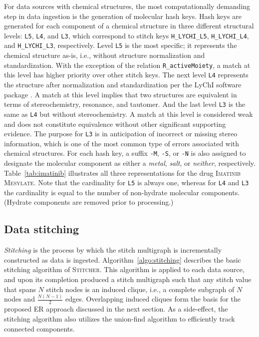 \documentclass{bmcart}
\newcommand\st{\textsc{Stitcher}}
\begin{document}
For data sources with chemical structures, the most computationally
demanding step in data ingestion is the generation of molecular hash
keys. Hash keys are generated for each component of a chemical
structure in three different structural
levels: \texttt{L5}, \texttt{L4}, and \texttt{L3}, which correspond to
stitch keys \texttt{H\_LYCHI\_L5}, \texttt{H\_LYCHI\_L4},
and \texttt{H\_LYCHI\_L3}, respectively. Level \texttt{L5} is the most
specific; it represents the chemical structure as-is, i.e., without
structure normalization and standardization. With the exception of the
relation \texttt{R\_activeMoiety}, a match at this level has higher
priority over other stitch keys. The next level \texttt{L4} represents
the structure after normalization and standardization per the LyChI
software package \cite{lychi}. A match at this level implies that two
structures are equivalent 
in terms of stereochemistry, resonance, and tautomer. And the last
level \texttt{L3} is the same as \texttt{L4} but without
stereochemistry. A match at this level is considered weak and does not
constitute equivalence without other significant supporting evidence.
The purpose for \texttt{L3} is in anticipation of incorrect or missing
stereo information, which is one of the most common type of errors
associated with chemical structures. For each hash key, a
suffix \texttt{-M}, \texttt{-S}, or \texttt{-N} is also assigned to
designate the molecular component as either
a \emph{metal}, \emph{salt}, or \emph{neither}, respectively.
Table~\ref{tab:imatinib} illustrates all three representations for the
drug \textsc{Imatinib Mesylate}. Note that the cardinality
for \texttt{L5} is always one, whereas for \texttt{L4} and \texttt{L3}
the cardinality is equal to the number of non-hydrate molecular
components. (Hydrate components are removed prior to processing.) 

\subsection*{Data stitching}
\emph{Stitching} is the process by which the stitch multigraph is
incrementally constructed as data is ingested.
Algorithm~\ref{algo:stitching} describes the basic stitching algorithm
of \st. This algorithm is applied to each data source, and upon its
completion produced a stitch multigraph such that any stitch value
that spans $N$ stitch nodes is an induced clique, i.e., a complete
subgraph of $N$ nodes and $\frac{N(N-1)}{2}$ edges. Overlapping
induced cliques form the basis for the proposed ER
approach discussed in the next section. As a side-effect, the
stitching algorithm also utilizes the union-find
algorithm \cite{Cormen2001} to efficiently track connected
components. 
\end{document}
